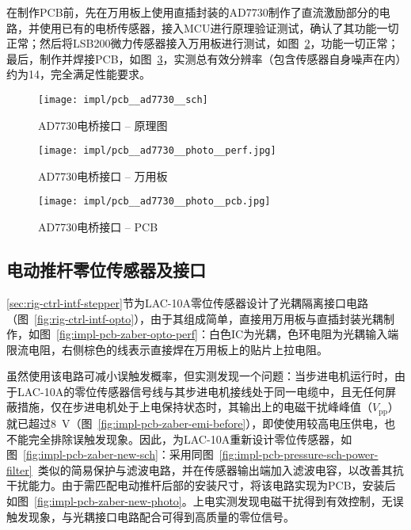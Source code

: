 在制作PCB前，先在万用板上使用直插封装的AD7730制作了直流激励部分的电路，并使用已有的电桥传感器，接入MCU进行原理验证测试，确认了其功能一切正常；然后将LSB200微力传感器接入万用板进行测试，如图~\ref{fig:impl-pcb-ad7730-photo-perf}，功能一切正常；最后，制作并焊接PCB，如图~\ref{fig:impl-pcb-ad7730-photo-pcb}，实测总有效分辨率（包含传感器自身噪声在内）约为\SI{14}{\bit}，完全满足性能要求。

\begin{figure}[tbhp]
\centering
\texttt{[image: impl/pcb\_\_ad7730\_\_sch]}
\caption{AD7730电桥接口 -- 原理图}
\label{fig:impl-pcb-ad7730-sch}
\end{figure}

\begin{figure}[tbhp]
\centering
\texttt{[image: impl/pcb\_\_ad7730\_\_photo\_\_perf.jpg]}
\caption{AD7730电桥接口 -- 万用板}
\label{fig:impl-pcb-ad7730-photo-perf}
\end{figure}

\begin{figure}[tbhp]
\centering
\texttt{[image: impl/pcb\_\_ad7730\_\_photo\_\_pcb.jpg]}
\caption{AD7730电桥接口 -- PCB}
\label{fig:impl-pcb-ad7730-photo-pcb}
\end{figure}


\clearpage


\subsection{电动推杆零位传感器及接口}\label{sec:impl-pcb-zaber}

\ref{sec:rig-ctrl-intf-stepper}节为LAC-10A零位传感器设计了光耦隔离接口电路（图~\ref{fig:rig-ctrl-intf-opto}），由于其组成简单，直接用万用板与直插封装光耦制作，如图~\ref{fig:impl-pcb-zaber-opto-perf}：白色IC为光耦，色环电阻为光耦输入端限流电阻，右侧棕色的线表示直接焊在万用板上的贴片上拉电阻。

虽然使用该电路可减小误触发概率，但实测发现一个问题：当步进电机运行时，由于LAC-10A的零位传感器信号线与其步进电机接线处于同一电缆中，且无任何屏蔽措施，仅在步进电机处于上电保持状态时，其输出上的电磁干扰峰峰值（$V_{\mathrm{pp}}$）就已超过\SI{8}{\V}（图~\ref{fig:impl-pcb-zaber-emi-before}），即使使用较高电压供电，也不能完全排除误触发现象。因此，为LAC-10A重新设计零位传感器，如图~\ref{fig:impl-pcb-zaber-new-sch}：采用同图~\ref{fig:impl-pcb-pressure-sch-power-filter}~类似的简易保护与滤波电路，并在传感器输出端加入滤波电容，以改善其抗干扰能力。由于需匹配电动推杆后部的安装尺寸，将该电路实现为PCB，安装后如图~\ref{fig:impl-pcb-zaber-new-photo}。上电实测发现电磁干扰得到有效控制，无误触发现象，与光耦接口电路配合可得到高质量的零位信号。


